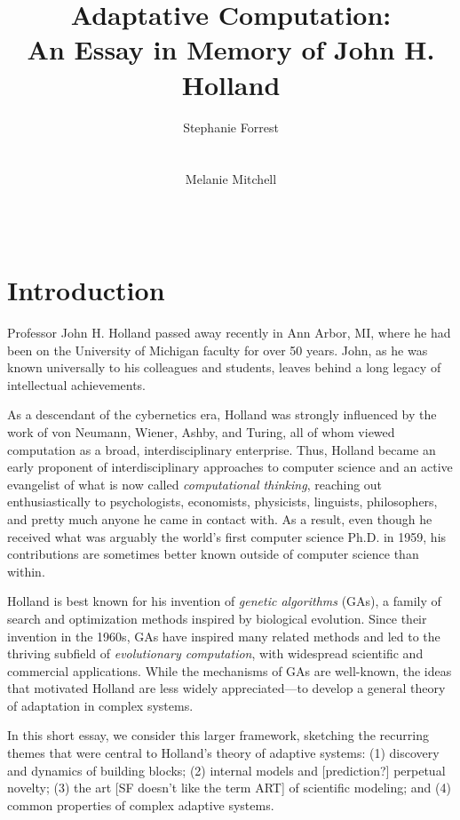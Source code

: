 \documentclass{sig-alternate}
\title{Adaptative Computation:\\ An Essay in Memory of John H. Holland}
\author 
{\alignauthor
 Stephanie Forrest\\
 \affaddr{University of New Mexico}\\
 \affaddr{Santa Fe Institute}\\
 \email{forrest@cs.unm.edu}
 \alignauthor
Melanie Mitchell \\
 \affaddr{Portland State University}\\
 \affaddr{Santa Fe Institute}\\
 \email{mm@pdx.edu}
}
\begin{document}
\maketitle

% 

\section{Introduction}

Professor John H. Holland passed away recently in Ann Arbor, MI, where
he had been on the University of Michigan faculty for over 50 years.  John, as he was known
universally to his colleagues and students, leaves behind a long
legacy of intellectual achievements.

As a descendant of the cybernetics era, Holland was strongly influenced
by the work of von Neumann, Wiener, Ashby, and Turing, all of whom
viewed computation as a broad, interdisciplinary enterprise.  Thus,
Holland became an early proponent of interdisciplinary approaches to
computer science and an active evangelist of what is now called
\emph{computational thinking}, reaching out enthusiastically to
psychologists, economists, physicists, linguists, philosophers, and
pretty much anyone he came in contact with.  As a result, even though
he received what was arguably the world's first computer science
Ph.D. in 1959, his contributions are sometimes better known outside of
computer science than within.

Holland is best known for his invention of \emph{genetic
  algorithms} (GAs), a family of search and optimization methods inspired
by biological evolution.  Since their invention in the 1960s, GAs have
inspired many related methods and led to the thriving subfield of
\emph{evolutionary computation}, with widespread scientific and
commercial applications.  While the mechanisms of GAs are well-known,
the ideas that motivated Holland are less widely appreciated---to develop a general
theory of adaptation in complex systems.  

In this short essay, we consider this larger framework, sketching the
recurring themes that were central to Holland's theory of
adaptive systems: (1) discovery and 
dynamics of building blocks; (2) internal models and [prediction?] perpetual
novelty; (3) the art [SF doesn't like the term ART] of scientific modeling; and (4) common
properties of complex adaptive systems.  
\end{document}
